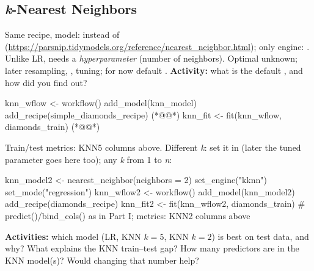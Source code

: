 \subsection{\emph{k}-Nearest Neighbors}
%
Same recipe,  model:  instead of  (\url{https://parsnip.tidymodels.org/reference/nearest_neighbor.html}); only engine: .
Unlike LR, needs a \emph{hyperparameter}  (number of neighbors). Optimal  unknown; later resampling, , tuning; for now default . \textbf{Activity:} what is the default , and how did you find out?
\begin{rcode}
knn_wflow <- workflow() %
  add_model(knn_model) %
  add_recipe(simple_diamonds_recipe) (*@@*)
knn_fit <- fit(knn_wflow, diamonds_train)  (*@@*)
\end{rcode}
Train/test metrics: KNN5 columns above. Different \emph{k}: set it in  (later the tuned parameter goes here too); any \emph{k} from 1 to \emph{n}:
\begin{rcode}
knn_model2 <- nearest_neighbor(neighbors = 2) %
  set_engine("kknn") %
  set_mode("regression")
knn_wflow2 <- workflow() %
  add_model(knn_model2) %
  add_recipe(diamonds_recipe)
knn_fit2 <- fit(knn_wflow2, diamonds_train)
# predict()/bind_cols() as in Part I; metrics: KNN2 columns above
\end{rcode}
%
\textbf{Activities:} which model (LR, KNN $k=5$, KNN $k=2$) is best on test data, and why? What explains the KNN train--test gap? How many predictors are in the KNN model(s)? Would changing that number help?

